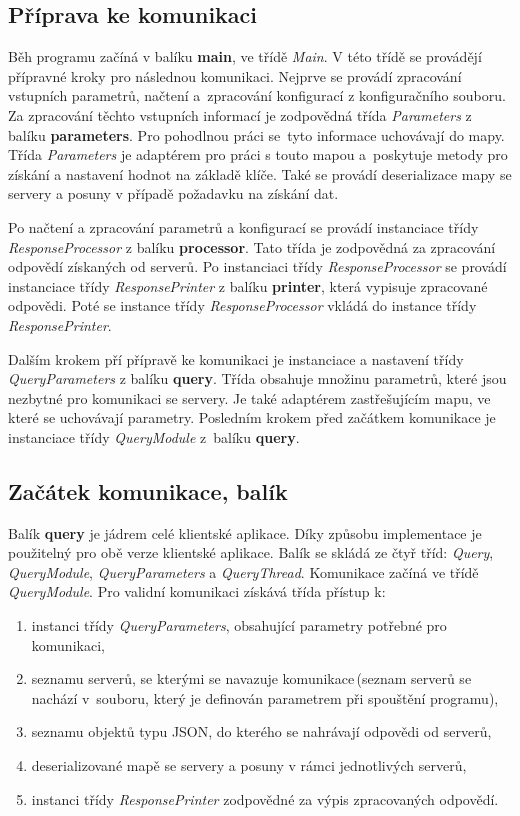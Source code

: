 \subsection*{Příprava ke komunikaci}
Běh programu začíná v balíku \textbf{main}, ve třídě \emph{Main}. V této třídě se provádějí přípravné kroky pro následnou komunikaci. Nejprve se provádí zpracování vstupních parametrů, načtení a~zpracování konfigurací z konfiguračního souboru. Za zpracování těchto vstupních informací je zodpovědná třída \emph{Parameters} z balíku \textbf{parameters}. Pro pohodlnou práci se~tyto informace uchovávají do mapy. Třída \emph{Parameters} je adaptérem pro práci s touto mapou a~poskytuje metody pro získání a nastavení hodnot na základě klíče. Také se provádí deserializace mapy se servery a posuny v případě požadavku na získání  dat.

Po načtení a zpracování parametrů a konfigurací se provádí instanciace třídy \emph{ResponseProcessor} z balíku \textbf{processor}. Tato třída je zodpovědná za zpracování odpovědí získaných od serverů. Po instanciaci třídy \emph{ResponseProcessor} se provádí instanciace třídy \emph{ResponsePrinter} z balíku  \textbf{printer}, která vypisuje zpracované odpovědi. Poté se instance třídy \emph{ResponseProcessor} vkládá do instance třídy \emph{ResponsePrinter}.

Dalším krokem pří přípravě ke komunikaci je instanciace a nastavení třídy \emph{QueryParameters} z balíku \textbf{query}. Třída obsahuje množinu parametrů, které jsou nezbytné pro komunikaci se servery. Je také adaptérem zastřešujícím mapu, ve které se uchovávají parametry. Posledním krokem před začátkem komunikace je instanciace třídy \emph{QueryModule} z~balíku \textbf{query}.


\subsection*{Začátek komunikace, balík }
Balík \textbf{query} je jádrem celé klientské aplikace. Díky způsobu implementace je použitelný pro obě verze klientské aplikace. Balík se skládá ze čtyř tříd: \emph{Query}, \emph{QueryModule}, \emph{QueryParameters} a \emph{QueryThread}. Komunikace začíná ve třídě \emph{QueryModule}. Pro validní komunikaci získává třída přístup k:
\begin{enumerate}
\item instanci třídy \emph{QueryParameters}, obsahující parametry potřebné pro komunikaci,

\item seznamu serverů, se kterými se navazuje komunikace\,(seznam serverů se nachází v~souboru, který je definován parametrem při spouštění programu),

\item seznamu objektů typu JSON, do kterého se nahrávají odpovědi od serverů,

\item deserializované mapě se servery a posuny v rámci jednotlivých serverů,

\item instanci třídy \emph{ResponsePrinter} zodpovědné za výpis zpracovaných odpovědí.
\end{enumerate}

